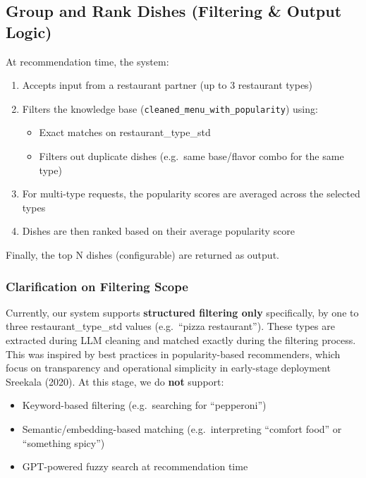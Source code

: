 \documentclass[
  11pt,
  a4paper,
  DIV=11,
  numbers=noendperiod]{scrartcl}
\providecommand{\tightlist}{%
  \setlength{\itemsep}{0pt}\setlength{\parskip}{0pt}}\usepackage{longtable,booktabs,array}
\begin{document}
\subsection{Group and Rank Dishes (Filtering \& Output
Logic)}\label{group-and-rank-dishes-filtering-output-logic}

At recommendation time, the system:

\begin{enumerate}
\def\labelenumi{\arabic{enumi}.}
\tightlist
\item
  Accepts input from a restaurant partner (up to 3 restaurant types)
\item
  Filters the knowledge base (\texttt{cleaned\_menu\_with\_popularity})
  using:

  \begin{itemize}
  \tightlist
  \item
    Exact matches on restaurant\_type\_std
  \item
    Filters out duplicate dishes (e.g.~same base/flavor combo for the
    same type)
  \end{itemize}
\item
  For multi-type requests, the popularity scores are averaged across the
  selected types
\item
  Dishes are then ranked based on their average popularity score
\end{enumerate}

Finally, the top N dishes (configurable) are returned as output.

\subsubsection{Clarification on Filtering
Scope}\label{clarification-on-filtering-scope}

Currently, our system supports \textbf{structured filtering only}
specifically, by one to three restaurant\_type\_std values (e.g.~``pizza
restaurant''). These types are extracted during LLM cleaning and matched
exactly during the filtering process. This was inspired by best
practices in popularity-based recommenders, which focus on transparency
and operational simplicity in early-stage deployment Sreekala (2020). At
this stage, we do \textbf{not} support:

\begin{itemize}
\tightlist
\item
  Keyword-based filtering (e.g.~searching for ``pepperoni'')
\item
  Semantic/embedding-based matching (e.g.~interpreting ``comfort food''
  or ``something spicy'')
\item
  GPT-powered fuzzy search at recommendation time
\end{itemize}
\end{document}
